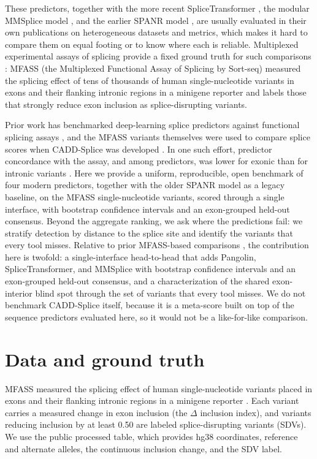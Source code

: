 \documentclass[11pt]{article}
\let\oldsection\section
\renewcommand{\section}{\Needspace*{7\baselineskip}\oldsection}
\begin{document}
These predictors, together with the more recent SpliceTransformer
\cite{splicetransformer}, the modular MMSplice model \cite{mmsplice}, and the
earlier SPANR model \cite{spanr}, are usually
evaluated in their own publications on heterogeneous datasets and metrics, which
makes it hard to compare them on equal footing or to know where each is reliable.
Multiplexed experimental assays of splicing provide a fixed ground truth for such
comparisons \cite{rosenberg}: MFASS (the Multiplexed Functional Assay of Splicing by Sort-seq) \cite{mfass} measured the splicing effect of tens of thousands of human
single-nucleotide variants in exons and their flanking intronic regions in a minigene
reporter and labels those that strongly reduce exon inclusion as splice-disrupting
variants.

Prior work has benchmarked deep-learning splice predictors against functional
splicing assays \cite{riepe,smithkitzman}, and the MFASS variants themselves were
used to compare splice scores when CADD-Splice was developed \cite{caddsplice}. In one
such effort, predictor concordance with the assay, and among predictors, was lower for
exonic than for intronic variants \cite{smithkitzman}. Here we provide a uniform, reproducible, open
benchmark of four modern predictors, together with the older SPANR model as a legacy
baseline, on
the MFASS single-nucleotide variants, scored through a single interface, with
bootstrap confidence intervals and an exon-grouped held-out consensus. Beyond
the aggregate ranking, we ask where the predictions fail: we stratify detection by
distance to the splice site and identify the variants that every tool misses. Relative
to prior MFASS-based comparisons \cite{smithkitzman,caddsplice}, the contribution here
is twofold: a single-interface head-to-head that adds Pangolin, SpliceTransformer, and
MMSplice with bootstrap confidence intervals and an exon-grouped held-out consensus, and
a characterization of the shared exon-interior blind spot through the set of variants
that every tool misses. We do not benchmark CADD-Splice itself, because it is a
meta-score built on top of the sequence predictors evaluated here, so it would not be a
like-for-like comparison.

\section{Data and ground truth}
MFASS measured the
splicing effect of human single-nucleotide variants placed in exons and their
flanking intronic regions in a minigene reporter \cite{mfass}. Each variant carries
a measured change in exon inclusion (the $\Delta$ inclusion index), and variants
reducing inclusion by at least 0.50 are labeled splice-disrupting variants (SDVs).
We use the public processed table, which provides hg38 coordinates, reference and
alternate alleles, the continuous inclusion change, and the SDV label.
\end{document}
